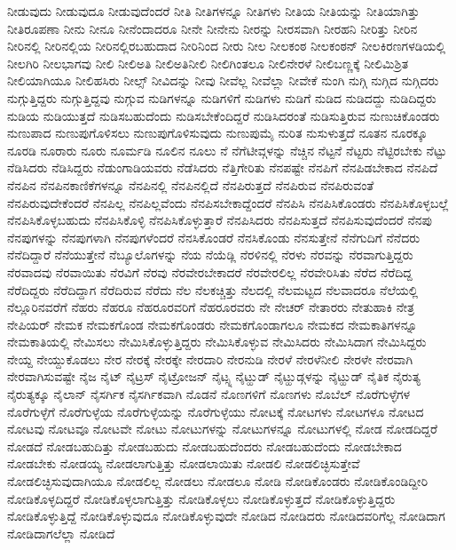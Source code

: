 {ನೀಡುವುದು
ನೀಡುವುದೂ
ನೀಡುವುದೆಂದರೆ
ನೀತಿ
ನೀತಿಗಳನ್ನೂ
ನೀತಿಗಳು
ನೀತಿಯ
ನೀತಿಯನ್ನು
ನೀತಿಯಾಗಿತ್ತು
ನೀತಿರೂಪಣಾ
ನೀನು
ನೀನೂ
ನೀನೆಂದಾದರೂ
ನೀನೇ
ನೀನೇನು
ನೀರನ್ನು
ನೀರಸವಾಗಿ
ನೀರಹನಿ
ನೀರಿತ್ತು
ನೀರಿನ
ನೀರಿನಲ್ಲಿ
ನೀರಿನಲ್ಲಿಯ
ನೀರಿನಲ್ಲಿರಬಹುದಾದ
ನೀರಿನಿಂದ
ನೀರು
ನೀಲ
ನೀಲಕಂಠ
ನೀಲಕಂಠನ್
ನೀಲಕಿರಣಗಳಡಿಯಲ್ಲಿ
ನೀಲಗಿರಿ
ನೀಲಭಾಗವು
ನೀಲಿ
ನೀಲಿಅತಿ
ನೀಲಿಅತಿನೀಲಿ
ನೀಲಿಗಿಂತಲೂ
ನೀಲಿನೇರಳೆ
ನೀಲಿಬಣ್ಣಕ್ಕೆ
ನೀಲಿಮಿಶ್ರಿತ
ನೀಲಿಯಾಗಿಯೂ
ನೀಲಿಹಸಿರು
ನೀಲ್ಸ್
ನೀವಿದನ್ನು
ನೀವು
ನೀವೆಲ್ಲ
ನೀವೆಲ್ಲಾ
ನೀವೇಕೆ
ನುಂಗಿ
ನುಗ್ಗಿ
ನುಗ್ಗಿದ
ನುಗ್ಗಿದರು
ನುಗ್ಗುತ್ತಿದ್ದರು
ನುಗ್ಗುತ್ತಿದ್ದವು
ನುಗ್ಗುವ
ನುಡಿಗಳನ್ನೂ
ನುಡಿಗಳಿಗೆ
ನುಡಿಗಳು
ನುಡಿಗೆ
ನುಡಿದ
ನುಡಿದದ್ದು
ನುಡಿದಿದ್ದರು
ನುಡಿಯ
ನುಡಿಯುತ್ತದೆ
ನುಡಿಸಬಹುದೆಂದು
ನುಡಿಸಬೇಕೆಂದಿದ್ದರೆ
ನುಡಿಸಿದರಂತೆ
ನುಡಿಸುತ್ತಿರುವ
ನುಣುಚಿಕೊಂಡರು
ನುಣುಪಾದ
ನುಣುಪುಗೊಳಿಸಲು
ನುಣುಪುಗೊಳಿಸುವುದು
ನುಣುಪುಮೈ
ನುರಿತ
ನುಸುಳುತ್ತದೆ
ನೂತನ
ನೂರಕ್ಕೂ
ನೂರಡಿ
ನೂರಾರು
ನೂರು
ನೂರ್ಮಡಿ
ನೂಲಿನ
ನೂಲು
ನೆ
ನೆಗೆಟೀವ್ಗಳನ್ನು
ನೆಚ್ಚಿನ
ನೆಟ್ಟನೆ
ನೆಟ್ಟರು
ನೆಟ್ಟಿರಬೇಕು
ನೆಟ್ಟು
ನೆಡಿಸಿದರು
ನೆಡಿಸಿದ್ದರು
ನೆಡುಂಗಾಡಿಯವರು
ನೆಡೆಸಿದರು
ನೆತ್ತಿಗೇರಿತು
ನೆನಪಷ್ಟೇ
ನೆನಪಿಗೆ
ನೆನಪಿಡಬೇಕಾದ
ನೆನಪಿದೆ
ನೆನಪಿನ
ನೆನಪಿನಕಾಣಿಕೆಗಳನ್ನೂ
ನೆನಪಿನಲ್ಲಿ
ನೆನಪಿನಲ್ಲಿದೆ
ನೆನಪಿರುತ್ತದೆ
ನೆನಪಿರುವ
ನೆನಪಿರುವಂತೆ
ನೆನಪಿರುವುದೇಕೆಂದರೆ
ನೆನಪಿಲ್ಲ
ನೆನಪಿಲ್ಲವೆಂದು
ನೆನಪಿಸಬೇಕಾದ್ದೆಂದರೆ
ನೆನಪಿಸಿ
ನೆನಪಿಸಿಕೊಂಡರು
ನೆನಪಿಸಿಕೊಳ್ಳಬಲ್ಲೆ
ನೆನಪಿಸಿಕೊಳ್ಳಬಹುದು
ನೆನಪಿಸಿಕೊಳ್ಳಿ
ನೆನಪಿಸಿಕೊಳ್ಳುತ್ತಾರೆ
ನೆನಪಿಸಿದರು
ನೆನಪಿಸುತ್ತದೆ
ನೆನಪಿಸುವುದೆಂದರೆ
ನೆನಪು
ನೆನಪುಗಳನ್ನು
ನೆನಪುಗಳಾಗಿ
ನೆನಪುಗಳೆಂದರೆ
ನೆನಸಿಕೊಂಡರೆ
ನೆನಸಿಕೊಂಡು
ನೆನಸುತ್ತೇನೆ
ನೆನೆಗುದಿಗೆ
ನೆನೆದರು
ನೆನೆದಿದ್ದಾರೆ
ನೆನೆಯುತ್ತೇನೆ
ನೆಬ್ಯೂಲೊಗಳನ್ನು
ನೆಯ
ನೆಯೆಡ್ಲಿ
ನೆರಳಿನಲ್ಲಿ
ನೆರಳು
ನೆರವನ್ನು
ನೆರವಾಗುತ್ತಿದ್ದರು
ನೆರವಾದವು
ನೆರವಾಯಿತು
ನೆರವಿಗೆ
ನೆರವು
ನೆರವೇರಬೇಕಾದರೆ
ನೆರವೇರಲಿಲ್ಲ
ನೆರವೇರಿಸಿತು
ನೆರೆದ
ನೆರೆದಿದ್ದ
ನೆರೆದಿದ್ದರು
ನೆರೆದಿದ್ದಾಗ
ನೆರೆದಿರುವ
ನೆರೆದು
ನೆಲ
ನೆಲಕಚ್ಚಿತ್ತು
ನೆಲದಲ್ಲಿ
ನೆಲಮಟ್ಟದ
ನೆಲವಾದರೂ
ನೆಲೆಯಲ್ಲಿ
ನೆಲ್ಲೂರಿನವರೆಗೆ
ನೆಹರು
ನೆಹರೂ
ನೆಹರೂರವರಿಗೆ
ನೆಹರೂರವರು
ನೇ
ನೇಚರ್
ನೇತಾರರು
ನೇತುಹಾಕಿ
ನೇತ್ರ
ನೇಪಿಯರ್
ನೇಮಕ
ನೇಮಕಗೊಂಡ
ನೇಮಕಗೊಂಡರು
ನೇಮಕಗೊಂಡಾಗಲೂ
ನೇಮಕದ
ನೇಮಕಾತಿಗಳನ್ನೂ
ನೇಮಕಾತಿಯಲ್ಲಿ
ನೇಮಿಸಲು
ನೇಮಿಸಿಕೊಳ್ಳುತ್ತಿದ್ದರು
ನೇಮಿಸಿಕೊಳ್ಳುವ
ನೇಮಿಸಿದರು
ನೇಮಿಸಿದಾಗ
ನೇಮಿಸಿದ್ದರು
ನೇಯ್ದ
ನೇಯ್ದುಕೊಡಲು
ನೇರ
ನೇರಕ್ಕೆ
ನೇರಕ್ಕೇ
ನೇರದಾರಿ
ನೇರನುಡಿ
ನೇರಳೆ
ನೇರಳೆನೀಲಿ
ನೇರಳೇ
ನೇರವಾಗಿ
ನೇರವಾಗಿಸುವಷ್ಟೇ
ನೈಜ
ನೈಟ್
ನೈಟ್ರಸ್
ನೈಟ್ರೋಜನ್
ನೈಟ್ಸ್ನ
ನೈಟ್ಹುಡ್
ನೈಟ್ಹುಡ್ಗಳನ್ನು
ನೈಟ್ಹುಡ್
ನೈತಿಕ
ನೈರುತ್ಯ
ನೈರುತ್ಯಕ್ಕೂ
ನೈಲಾನ್
ನೈಸರ್ಗಿಕ
ನೈಸರ್ಗಿಕವಾಗಿ
ನೊಡನೆ
ನೊಣಗಳಿಗೆ
ನೊಣಗಳು
ನೊಬೆಲ್
ನೊರೆಗುಳ್ಳೆಗಳ
ನೊರೆಗುಳ್ಳೆಗೆ
ನೊರೆಗುಳ್ಳೆಯ
ನೊರೆಗುಳ್ಳೆಯನ್ನು
ನೊರೆಗುಳ್ಳೆಯು
ನೋಟಕ್ಕೆ
ನೋಟಗಳು
ನೋಟಗಳೂ
ನೋಟದ
ನೋಟವು
ನೋಟವೂ
ನೋಟವೇ
ನೋಟು
ನೋಟುಗಳನ್ನು
ನೋಟುಗಳನ್ನೂ
ನೋಟುಗಳಲ್ಲಿ
ನೋಡ
ನೋಡದಿದ್ದರೆ
ನೋಡದೆ
ನೋಡಬಹುದಿತ್ತು
ನೋಡಬಹುದು
ನೋಡಬಹುದೆಂದರು
ನೋಡಬಹುದೆಂದು
ನೋಡಬೇಕಾದ
ನೋಡಬೇಕು
ನೋಡಯ್ಯ
ನೋಡಲಾಗುತ್ತಿತ್ತು
ನೋಡಲಾಯಿತು
ನೋಡಲಿ
ನೋಡಲಿಚ್ಛಿಸುತ್ತೇವೆ
ನೋಡಲಿಚ್ಛಿಸುವುದಾಗಿಯೂ
ನೋಡಲಿಲ್ಲ
ನೋಡಲು
ನೋಡಲೂ
ನೋಡಿ
ನೋಡಿಕೊಂಡರು
ನೋಡಿಕೊಂಡಿದ್ದೀರಿ
ನೋಡಿಕೊಳ್ಳದಿದ್ದರೆ
ನೋಡಿಕೊಳ್ಳಲಾಗುತ್ತಿತ್ತು
ನೋಡಿಕೊಳ್ಳಲು
ನೋಡಿಕೊಳ್ಳುತ್ತದೆ
ನೋಡಿಕೊಳ್ಳುತ್ತಿದ್ದರು
ನೋಡಿಕೊಳ್ಳುತ್ತಿದ್ದೆ
ನೋಡಿಕೊಳ್ಳುವುದೂ
ನೋಡಿಕೊಳ್ಳುವುದೇ
ನೋಡಿದ
ನೋಡಿದರು
ನೋಡಿದವರಿಗೆಲ್ಲ
ನೋಡಿದಾಗ
ನೋಡಿದಾಗಲೆಲ್ಲಾ
ನೋಡಿದೆ
}
